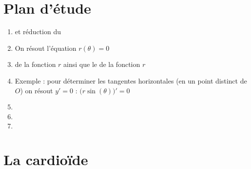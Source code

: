 \section{Plan d'étude}

\begin{frame}
\begin{enumerate}
  \item {} et réduction du  
\pause
\item {} On résout l'équation $r(\theta)=0$

\pause
\item {} de la fonction $r$ ainsi que le  de 
la fonction $r$

\pause
\item {} 

Exemple : pour déterminer les tangentes horizontales (en un point distinct de $O$)
 on résout $y'=0$ : $\big(r\sin(\theta)\big)'=0$

\pause
\item {}
\pause	
\item {}
\pause
\item {} 

\end{enumerate}

\end{frame}






\section{La cardioïde}

